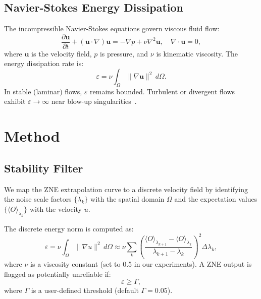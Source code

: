 \documentclass[twocolumn,showpacs,preprintnumbers,amsmath,amssymb,prl]{revtex4-2}
\begin{document}
\subsection{Navier-Stokes Energy Dissipation}

The incompressible Navier-Stokes equations govern viscous fluid flow:
\begin{equation}
    \frac{\partial \mathbf{u}}{\partial t}
    + (\mathbf{u} \cdot \nabla)\mathbf{u}
    = -\nabla p + \nu \nabla^2 \mathbf{u},
    \quad \nabla \cdot \mathbf{u} = 0,
\end{equation}
where $\mathbf{u}$ is the velocity field, $p$ is pressure, and $\nu$ is
kinematic viscosity. The energy dissipation rate is:
\begin{equation}
    \varepsilon = \nu \int_\Omega \|\nabla \mathbf{u}\|^2 \, d\Omega.
\end{equation}
In stable (laminar) flows, $\varepsilon$ remains bounded. Turbulent or
divergent flows exhibit $\varepsilon \to \infty$ near blow-up
singularities~\cite{Tao2016, DeepMind2025}.

\section{Method}
\label{sec:method}

\subsection{Stability Filter}
\label{subsec:filter}

We map the ZNE extrapolation curve to a discrete velocity field by
identifying the noise scale factors $\{\lambda_k\}$ with the spatial
domain $\Omega$ and the expectation values
$\{\langle O \rangle_{\lambda_k}\}$ with the velocity $u$.

The discrete energy norm is computed as:
\begin{equation}
    \varepsilon = \nu \int_\Omega \|\nabla u\|^2 \, d\Omega
    \approx \nu \sum_{k} \left(
    \frac{\langle O \rangle_{\lambda_{k+1}}
          - \langle O \rangle_{\lambda_k}}
         {\lambda_{k+1} - \lambda_k}
    \right)^2 \Delta\lambda_k,
    \label{eq:epsilon}
\end{equation}
where $\nu$ is a viscosity constant (set to 0.5 in our experiments).
A ZNE output is flagged as potentially unreliable if:
\begin{equation}
    \varepsilon \geq \Gamma,
    \label{eq:criterion}
\end{equation}
where $\Gamma$ is a user-defined threshold (default $\Gamma = 0.05$).
\end{document}
